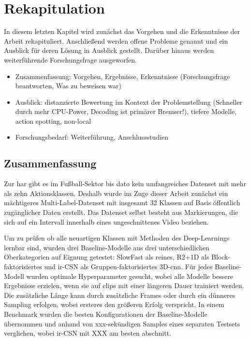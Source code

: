 \chapter{Rekapitulation}
\label{ch:zusammenfassung}

In diesem letzten Kapitel wird zunächst das Vorgehen und die Erkenntnisse der Arbeit rekapituliert.
Anschließend werden offene Probleme genannt und ein Ausblick für deren Lösung in Ausblick gestellt.
Darüber hinaus werden weiterführende Forschungsfrage ausgeworfen.

\begin{tcolorbox}[title=WIP]
 \begin{itemize}
  \item Zusammenfassung: Vorgehen, Ergebnisse, Erkenntnisse (Forschungsfrage beantworten, Was zu beweisen war)
  \item Ausblick: distanzierte Bewertung im Kontext der Problemstellung (Schneller durch mehr CPU-Power, Decoding ist primärer Bremser!), tiefere Modelle, action spotting, non-local
  \item Forschungsbedarf: Weiterführung, Anschlussstudien
 \end{itemize}
 \end{tcolorbox}

\section{Zusammenfassung}
\label{sec:rekapitulation}

Zur \gls{har} gibt es im Fußball-Sektor bis dato kein umfangreiches Datenset mit mehr als zehn Aktionsklassen.
Deshalb wurde im Zuge dieser Arbeit zunächst ein mächtigeres Multi-Label-Datenset mit insgesamt 32 Klassen auf Basis öffentlich zugänglicher Daten erstellt.
Das Datenset selbst besteht aus Markierungen, die sich auf ein Intervall innerhalb eines ungeschnittenes Video beziehen.

Um zu prüfen ob alle neuartigen Klassen mit Methoden des Deep-Learnings lernbar sind, wurden drei Baseline-Modelle aus drei unterschiedlichen Oberkategorien auf Eignung getestet:
SlowFast als reines, R2+1D als Block-faktorisiertes und ir-CSN als Gruppen-faktorisiertes 3D-\gls{cnn}.
Für jedes Baseline-Modell wurden optimale Hyperparameter gesucht, wobei alle Modelle bessere Ergebnisse erzielen, wenn sie auf \glspl{clip} mit einer längeren Dauer trainiert werden.
Die zusätzliche Länge kann durch zusätzliche Frames oder durch ein dünneres Sampling erfolgen, wobei ersteres den größeren Erfolg verspricht.
In einem Benchmark wurden die besten Konfigurationen der Baseline-Modelle übernommen und anhand von xxx-sekündigen Samples eines separaten Testsets verglichen, wobei ir-CSN mit XXX am besten abschnitt.

